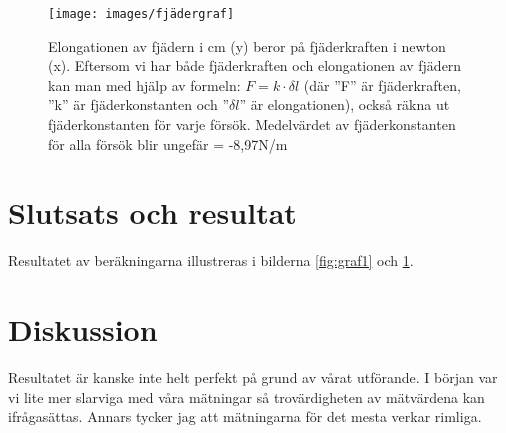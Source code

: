 \documentclass[11p, titlepage, oneside, a4paper]{article}
\begin{document}
        \begin{figure}[!h]
            \texttt{[image: images/fjädergraf]}
            \caption{Elongationen av fjädern i cm (y) beror på fjäderkraften i newton (x). Eftersom vi har både fjäderkraften och elongationen av fjädern kan man med hjälp av formeln: $F = {k}\cdot{\delta l}$ (där ''F'' är fjäderkraften, ''k'' är fjäderkonstanten och ''$\delta l$'' är elongationen), också räkna ut fjäderkonstanten för varje försök. Medelvärdet av fjäderkonstanten för alla försök blir ungefär = -8,97N/m}
            \label{fig:graf2}
        \end{figure}
    
    \section{Slutsats och resultat} 
        Resultatet av beräkningarna illustreras i bilderna \ref{fig:graf1} och \ref{fig:graf2}.
    \section{Diskussion} 
    Resultatet är kanske inte helt perfekt på grund av vårat utförande. I början var vi lite mer slarviga med våra mätningar så trovärdigheten av mätvärdena kan ifrågasättas. Annars tycker jag att mätningarna för det mesta verkar rimliga.


    
    \printbibliography
\end{document}
